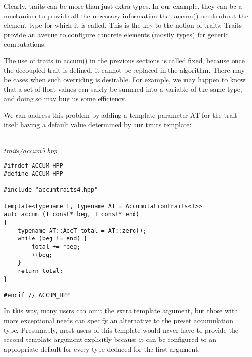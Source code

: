 Clearly, traits can be more than just extra types. In our example, they can be a mechanism to provide all the necessary information that accum() needs about the element type for which it is called. This is the key to the notion of traits: Traits provide an avenue to configure concrete elements (mostly types) for generic computations.


The use of traits in accum() in the previous sections is called fixed, because once the decoupled trait is defined, it cannot be replaced in the algorithm. There may be cases when such overriding is desirable. For example, we may happen to know that a set of float values can safely be summed into a variable of the same type, and doing so may buy us some efficiency.

We can address this problem by adding a template parameter AT for the trait itself having a default value determined by our traits template:

\hspace*{\fill} \\ %
\noindent
\textit{traits/accum5.hpp}
\begin{lstlisting}[style=styleCXX]
#ifndef ACCUM_HPP
#define ACCUM_HPP

#include "accumtraits4.hpp"

template<typename T, typename AT = AccumulationTraits<T>>
auto accum (T const* beg, T const* end)
{
	typename AT::AccT total = AT::zero();
	while (beg != end) {
		total += *beg;
		++beg;
	}
	return total;
}

#endif // ACCUM_HPP
\end{lstlisting}

In this way, many users can omit the extra template argument, but those with more exceptional needs can specify an alternative to the preset accumulation type. Presumably, most users of this template would never have to provide the second template argument explicitly because it can be configured to an appropriate default for every type deduced for the first argument.









